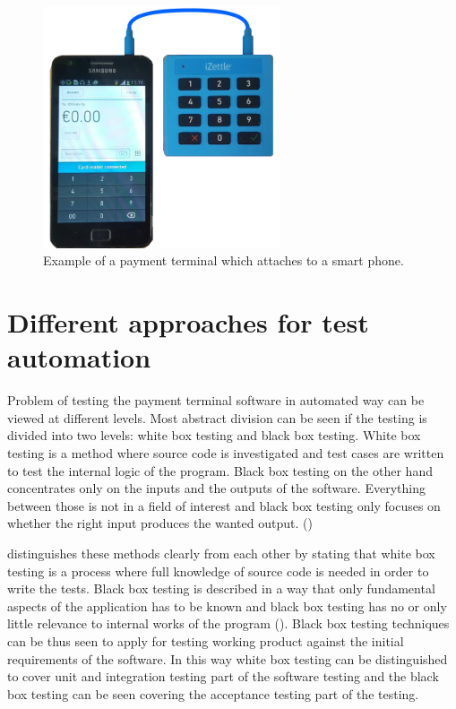 \begin{figure}[ht]
  \begin{center}
    \includegraphics[width=7cm]{images/izettle.png}
    \caption{Example of a payment terminal which attaches to a smart phone.}
    \label{fig:izettle}
  \end{center}
\end{figure}

\section{Different approaches for test automation}

Problem of testing the payment terminal software in automated way can be viewed at different levels. Most abstract division can be seen if the testing is divided into two levels: white box testing and black box testing. White box testing is a method where source code is investigated and test cases are written to test the internal logic of the program. Black box testing on the other hand concentrates only on the inputs and the outputs of the software. Everything between those is not in a field of interest and black box testing only focuses on whether the right input produces the wanted output. (\emph{\cite{myers2011art}})

\emph{\cite{khan2012comparative}} distinguishes these methods clearly from each other by stating that white box testing is a process where full knowledge of source code is needed in order to write the tests. Black box testing is described in a way that only fundamental aspects of the application has to be known and black box testing has no or only little relevance to internal works of the program (\emph{\cite{pressman2005software}}). Black box testing techniques can be thus seen to apply for testing working product against the initial requirements of the software. In this way white box testing can be distinguished to cover unit and integration testing part of the software testing and the black box testing can be seen covering the acceptance testing part of the testing.

